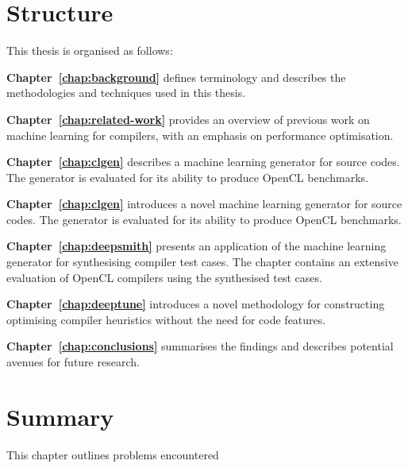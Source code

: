 \section{Structure}

This thesis is organised as follows:

\textbf{Chapter~\ref{chap:background}} defines terminology and describes the  methodologies and techniques used in this thesis.

\textbf{Chapter~\ref{chap:related-work}} provides an overview of previous work on machine learning for compilers, with an emphasis on performance optimisation.

\textbf{Chapter~\ref{chap:clgen}} describes a machine learning generator for source codes. The generator is evaluated for its ability to produce OpenCL benchmarks.

\textbf{Chapter~\ref{chap:clgen}} introduces a novel machine learning generator for source codes. The generator is evaluated for its ability to produce OpenCL benchmarks.

\textbf{Chapter~\ref{chap:deepsmith}} presents an application of the machine learning generator for synthesising compiler test cases. The chapter contains an extensive evaluation of OpenCL compilers using the synthesised test cases.

\textbf{Chapter~\ref{chap:deeptune}} introduces a novel methodology for constructing optimising compiler heuristics without the need for code features.

\textbf{Chapter~\ref{chap:conclusions}} summarises the findings and describes potential avenues for future research.


\section{Summary}

This chapter outlines problems encountered